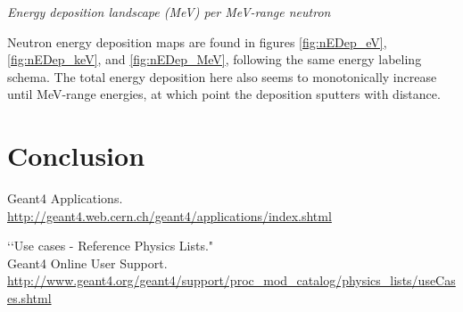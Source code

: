 \documentclass[11pt]{article}
\makeatletter
\newenvironment{figurehere}
{\def\@captype{figure}}{}
\makeatother
\begin{document}
\begin{multicols}{2}
\begin{figurehere}
\centering
{}
\caption{\small \emph{Energy deposition landscape (MeV) per MeV-range neutron}}
\label{fig:nEDep_MeV}
\end{figurehere}
\vspace{0.15 cm}

Neutron energy deposition maps are found in figures \ref{fig:nEDep_eV}, \ref{fig:nEDep_keV}, and \ref{fig:nEDep_MeV}, following the same energy labeling schema.  The total energy deposition here also seems to monotonically increase until MeV-range energies, at which point the deposition sputters with distance.

\section{Conclusion}

\begin{thebibliography}{99}

Geant4 Applications. \\
\url{http://geant4.web.cern.ch/geant4/applications/index.shtml}

\lq\lq Use cases - Reference Physics Lists." \\
Geant4 Online User Support. \\
\url{http://www.geant4.org/geant4/support/proc_mod_catalog/physics_lists/useCases.shtml}
 
\end{thebibliography}

\end{multicols}
\end{document}
